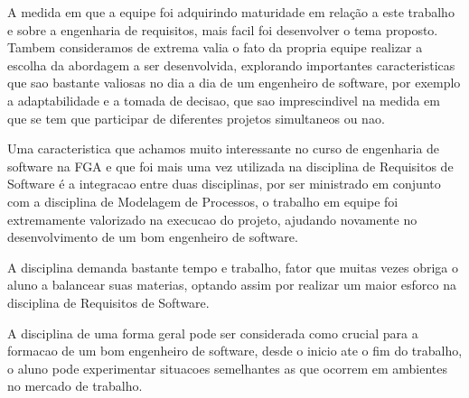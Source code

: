 A medida em que a equipe foi adquirindo maturidade em relação a este trabalho e sobre a
engenharia de requisitos, mais facil foi desenvolver o tema proposto. Tambem consideramos
de extrema valia o fato da propria equipe realizar a escolha da abordagem a ser desenvolvida,
explorando importantes caracteristicas que sao bastante valiosas no dia a dia de um engenheiro
de software, por exemplo a adaptabilidade e a tomada de decisao, que sao imprescindivel na
medida em que se tem que participar de diferentes projetos simultaneos ou nao.

Uma caracteristica que achamos muito interessante no curso de engenharia de software na
FGA e que foi mais uma vez utilizada na disciplina de Requisitos de Software é a integracao
entre duas disciplinas, por ser ministrado em conjunto com a disciplina de Modelagem de
Processos, o trabalho em equipe foi extremamente valorizado na execucao do projeto, ajudando
novamente no desenvolvimento de um bom engenheiro de software.

A disciplina demanda bastante tempo e trabalho, fator que muitas vezes obriga o aluno
a balancear suas materias, optando assim por realizar um maior esforco na disciplina
de Requisitos de Software.

A disciplina de uma forma geral pode ser considerada como crucial para a formacao
de um bom engenheiro de software, desde o inicio ate o fim do trabalho, o aluno pode
experimentar situacoes semelhantes as que ocorrem em ambientes no mercado de trabalho.
